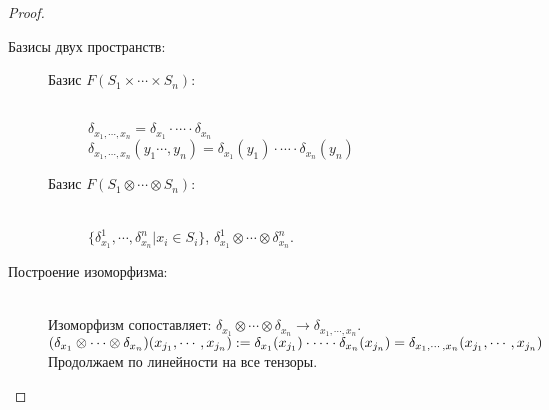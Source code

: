 \begin{description}
\begin{proof}
\begin{description}
    \item[Базисы двух пространств:]\hfill
    \begin{description}
    \item [Базис $F(S_1 \times \cdots \times S_n)$:] \hfill  \\
    $\delta_{x_1, \cdots, x_n} = \delta_{x_1} \cdot \cdots \cdot \delta_{x_n}$ \\
    $\delta_{x_1, \cdots, x_n}(y_1 \cdots, y_n) = \delta_{x_1}(y_1) \cdot \cdots \cdot \delta_{x_n}(y_n)$

    \item [Базис $F(S_1 \otimes \cdots \otimes S_n)$:]\hfill  \\
    $\{\delta_{x_1}^1, \cdots, \delta_{x_n}^n| x_i \in S_i\}$, 
    $\delta_{x_1}^{1} \otimes \cdots \otimes \delta_{x_n}^n$.
    \end{description}
    \item[Построение изоморфизма:] \hfill \\
    Изоморфизм сопоставляет: $\delta_{x_1} \otimes \cdots \otimes \delta_{x_n} \to \delta_{x_1, \cdots, x_n}$.\\ 
    $(\delta_{x_1} \otimes \cdots \otimes \delta_{x_n})(x_{j_1}, \cdots, x_{j_n}) := \delta_{x_1}(x_{j_1}) \cdot \cdots \cdot \delta_{x_n}(x_{j_n}) \\
    = \delta_{x_1, \cdots, x_n}(x_{j_1}, \cdots, x_{j_n})$\\

    Продолжаем по линейности на все тензоры. 
    

\end{description}
\end{proof}
\end{description}
